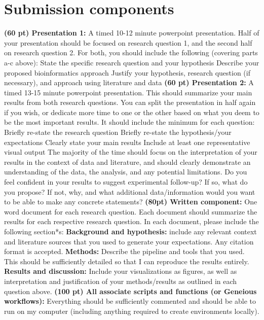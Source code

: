 \documentclass{article}
\begin{document}
\section*{Submission components}
\begin{outline}[enumerate]
    \1 \textbf{(60 pt) Presentation 1:} A timed 10-12 minute powerpoint presentation. Half of your presentation should be focused on research question 1, and the second half on research question 2. For both, you should include the following (covering parts a-c above):
        \2 State the specific research question and your hypothesis
        \2 Describe your proposed bioinformatics approach
        \2 Justify your hypothesis, research question (if necessary), and approach using literature and data
    \1 \textbf{(60 pt) Presentation 2:} A timed 13-15 minute powerpoint presentation. This should summarize your main results from both research questions. You can split the presentation in half again if you wish, or dedicate more time to one or the other based on what you deem to be the most important results. It should include the minimum for each question:
        \2 Briefly re-state the research question
        \2 Briefly re-state the hypothesis/your expectations
        \2 Clearly state your main results
        \2 Include at least one representative visual output
        \2 The majority of the time should focus on the interpretation of your results in the context of data and literature, and should clearly demonstrate an understanding of the data, the analysis, and any potential limitations. Do you feel confident in your results to suggest experimental follow-up? If so, what do you propose? If not, why, and what additional data/information would you want to be able to make any concrete statements?
    \1 \textbf{(80pt) Written component:} One word document for each research question. Each document should summarize the results for each respective research question. In each document, please include the following section*s:
        \2 \textbf{Background and hypothesis:} include any relevant context and literature sources that you used to generate your expectations. Any citation format is accepted.
        \2 \textbf{Methods:} Describe the pipeline and tools that you used. This should be sufficiently detailed so that I can reproduce the results entirely.
        \2 \textbf{Results and discussion:} Include your visualizations as figures, as well as interpretation and justification of your methods/results as outlined in each question above.
    \1 \textbf{(100 pt) All associate scripts and functions (or Geneious workflows):} Everything should be sufficiently commented and should be able to run on my computer (including anything required to create environments locally).
\end{outline}
\end{document}
